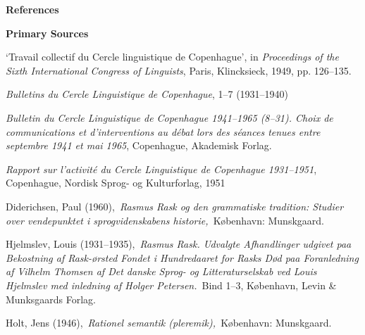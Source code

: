 \begin{styleStandard}
\textbf{References}
\end{styleStandard}

\begin{styleStandard}
\textbf{Primary Sources}
\end{styleStandard}

\begin{styleStandard}
‘Travail collectif du Cercle linguistique de Copenhague’, in \textit{Proceedings of the Sixth International Congress of Linguists}, Paris, Klincksieck, 1949, pp. 126–135.
\end{styleStandard}

\begin{styleStandard}
\textit{Bulletins du Cercle Linguistique de Copenhague}, 1–7 (1931–1940)
\end{styleStandard}

\begin{styleStandard}
\textit{Bulletin du Cercle Linguistique de Copenhague 1941–1965 (8–31). Choix de communications et d’interventions au débat lors des séances tenues entre septembre 1941 et mai 1965}, Copenhague, Akademisk Forlag.
\end{styleStandard}

\begin{styleStandard}
\textit{Rapport sur l’activité du Cercle Linguistique de Copenhague 1931–1951}, Copenhague, Nordisk Sprog- og Kulturforlag, 1951
\end{styleStandard}

\begin{styleStandard}
Diderichsen, Paul (1960),~\textit{Rasmus Rask og den grammatiske tradition: Studier over vendepunktet i sprogvidenskabens historie,~}København: Munskgaard.
\end{styleStandard}

\begin{styleStandard}
Hjelmslev, Louis (1931–1935),~\textit{Rasmus Rask. Udvalgte Afhandlinger udgivet paa Bekostning af Rask-ørsted Fondet i Hundredaaret for Rasks Død paa Foranledning af Vilhelm Thomsen af Det danske Sprog- og Litteraturselskab ved Louis Hjelmslev med inledning af Holger Petersen.}~Bind 1–3, København, Levin \& Munksgaards Forlag.
\end{styleStandard}

\begin{styleStandard}
Holt, Jens (1946),~\textit{Rationel semantik (pleremik),~}København: Munskgaard.
\end{styleStandard}

